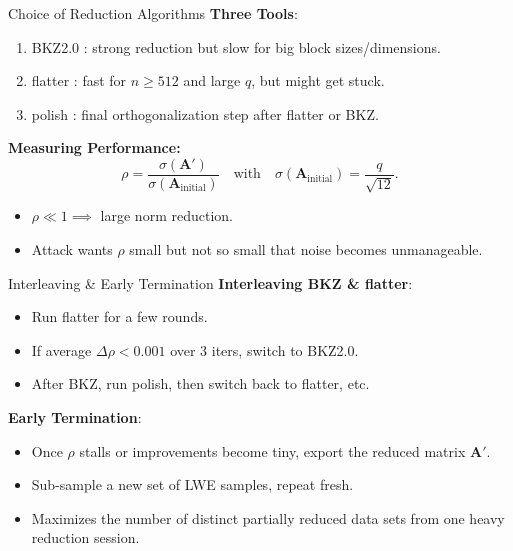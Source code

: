 \documentclass{beamer}
\begin{document}
\begin{frame}{Choice of Reduction Algorithms}
  \textbf{Three Tools}:
  \begin{enumerate}
    \item BKZ2.0 \cite{BKZ2ref}: strong reduction but slow for big block sizes/dimensions.
    \item flatter \cite{FlatterRef}: fast for $n \ge 512$ and large $q$, but might get stuck.
    \item polish \cite{PolishRef}: final orthogonalization step after flatter or BKZ.
  \end{enumerate}

  \vspace{0.3cm}
  \textbf{Measuring Performance:}  
  \[
    \rho = \frac{\sigma(\mathbf{A}')}{\sigma(\mathbf{A}_{\text{initial}})} \quad \text{with} \quad
    \sigma(\mathbf{A}_{\text{initial}}) = \frac{q}{\sqrt{12}}.
  \]
  \begin{itemize}
    \item $\rho \ll 1 \implies$ large norm reduction.
    \item Attack wants $\rho$ small but not so small that noise becomes unmanageable.
  \end{itemize}
\end{frame}

\begin{frame}{Interleaving \& Early Termination}
  \textbf{Interleaving BKZ \& flatter}:
  \begin{itemize}
    \item Run flatter for a few rounds.
    \item If average $\Delta\rho < 0.001$ over 3 iters, switch to BKZ2.0.
    \item After BKZ, run polish, then switch back to flatter, etc.
  \end{itemize}

  \textbf{Early Termination}:
  \begin{itemize}
    \item Once $\rho$ stalls or improvements become tiny, export the reduced matrix $\mathbf{A}'$.
    \item Sub-sample a new set of LWE samples, repeat fresh.
    \item Maximizes the number of distinct partially reduced data sets from one heavy reduction session.
  \end{itemize}
\end{frame}
\end{document}
